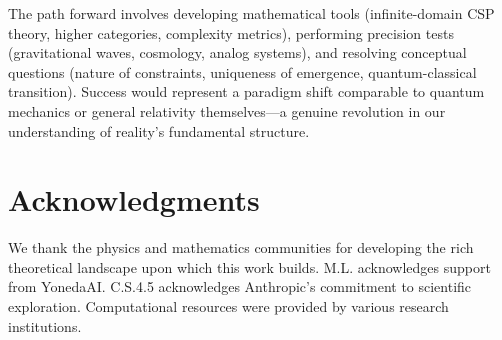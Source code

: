 \documentclass[11pt,a4paper]{article}
\theoremstyle{remark}
\theoremstyle{definition}
\begin{document}
The path forward involves developing mathematical tools (infinite-domain CSP theory, higher categories, complexity metrics), performing precision tests (gravitational waves, cosmology, analog systems), and resolving conceptual questions (nature of constraints, uniqueness of emergence, quantum-classical transition). Success would represent a paradigm shift comparable to quantum mechanics or general relativity themselves—a genuine revolution in our understanding of reality's fundamental structure.

\section*{Acknowledgments}

We thank the physics and mathematics communities for developing the rich theoretical landscape upon which this work builds. M.L. acknowledges support from YonedaAI. C.S.4.5 acknowledges Anthropic's commitment to scientific exploration. Computational resources were provided by various research institutions.
\end{document}
